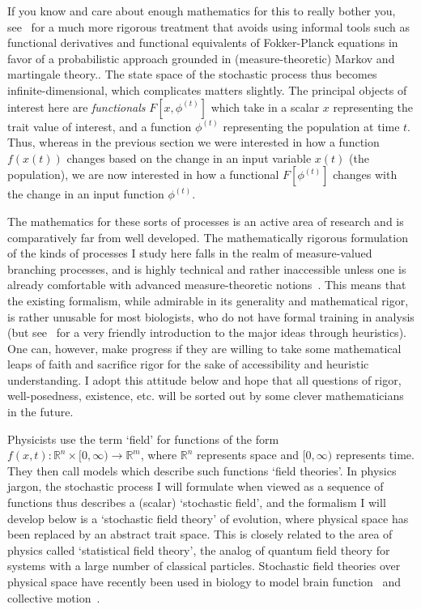{If you know and care about enough mathematics for this to really bother you, see~\citep{champagnat_unifying_2006} for a much more rigorous treatment that avoids using informal tools such as functional derivatives and functional equivalents of Fokker-Planck equations in favor of a probabilistic approach grounded in (measure-theoretic) Markov and martingale theory.}. The state space of the stochastic process thus becomes infinite-dimensional, which complicates matters slightly. The principal objects of interest here are \emph{functionals} $F[x, \phi^{(t)}]$ which take in a scalar $x$ representing the trait value of interest, and a function $\phi^{(t)}$ representing the population at time $t$. Thus, whereas in the previous section we were interested in how a function $f(x(t))$ changes based on the change in an input variable $x(t)$ (the population), we are now interested in how a functional $F[\phi^{(t)}]$ changes with the change in an input function $\phi^{(t)}$.

The mathematics for these sorts of processes is an active area of research and is comparatively far from well developed. The mathematically rigorous formulation of the kinds of processes I study here falls in the realm of measure-valued branching processes, and is highly technical and rather inaccessible unless one is already comfortable with advanced measure-theoretic notions~\citep{champagnat_unifying_2006,champagnat_individual_2008}. This means that the existing formalism, while admirable in its generality and mathematical rigor, is rather unusable for most biologists, who do not have formal training in analysis (but see~\cite{week_white_2021} for a very friendly introduction to the major ideas through heuristics). One can, however, make progress if they are willing to take some mathematical leaps of faith and sacrifice rigor for the sake of accessibility and heuristic understanding. I adopt this attitude below and hope that all questions of rigor, well-posedness, existence, etc. will be sorted out by some clever mathematicians in the future.

Physicists use the term `field' for functions of the form $f(x,t):\mathbb{R}^{n} \times [0,\infty) \to \mathbb{R}^{m}$, where $\mathbb{R}^{n}$ represents space and $[0,\infty)$ represents time. They then call models which describe such functions `field theories'. In physics jargon, the stochastic process I will formulate when viewed as a sequence of functions thus describes a (scalar) `stochastic field', and the formalism I will develop below is a `stochastic field theory' of evolution, where physical space has been replaced by an abstract trait space. This is closely related to the area of physics called `statistical field theory', the analog of quantum field theory for systems with a large number of classical particles. Stochastic field theories over physical space have recently been used in biology to model brain function~\citep{bressloff_stochastic_2010} and collective motion~\citep{o_laighleis_minimal_2018}.

